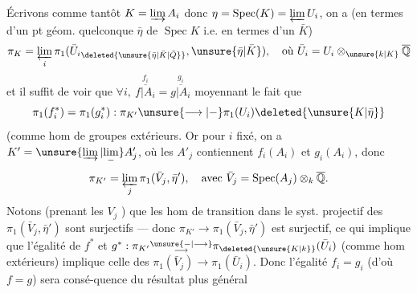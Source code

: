 Écrivons comme tantôt $K=\varinjlim A_i$ donc  $\eta=\operatorname{Spec}(K)=\varprojlim U_i$, on a (en termes d'un pt géom. quelconque $\bar\eta$ de $\operatorname{Spec}K$ i.e. en termes d'un $\bar K$)
\[
\pi_K=\varprojlim_i\pi_1(\bar U_i{}_{\deleted{\unsure{\bar\eta|\bar K|\bar Q}}},\unsure{\bar\eta|\bar K}),\quad\text{où }\bar U_i=U_i\otimes_{\unsure{k|K}}\overline{\mathbb Q}
\]
et il suffit de voir que $\forall i,\ \overset{f_i}{\overline{f|A_i}}=\overset{g_i}{\overline{g|A_i}}$  moyennant le fait que
\[
\pi_1(f_i^*)=\pi_1(g_i^*):\pi_{K'}\unsure{\longrightarrow|-}\pi_1(U_i)\deleted{\unsure{K|\bar\eta}}
\]
(comme hom de groupes extérieurs. Or pour $i$ fixé, on a $K'=\unsure{\varinjlim|\underset{-}{\lim}} A'_j$, où les $A'_j$ contiennent $f_i(A_i)$ et $g_i(A_i)$, donc
\[
\pi_{K'}=\varprojlim_j\pi_1(\bar V_j,\bar\eta'),\quad\text{avec }\bar V_j=\operatorname{Spec}(A_j)\otimes_k\overline{\mathbb Q}.
\]
Notons (prenant les $V_j$ ) que les hom de transition dans le syst. projectif des $\pi_1(\bar V_j,\bar\eta')$ sont surjectifs --- donc  $\pi_{K'}\longrightarrow\pi_1(\bar V_j,\bar\eta')$ est surjectif, ce qui implique que l'égalité de $f^*$ et $g^*:\pi_{K'}\substack{\unsure{-|\longrightarrow}\\\longrightarrow}\pi_{\deleted{\unsure{K|k}}}(\bar U_i)$ (comme hom extérieurs) implique celle des $\pi_1(\bar V_j)\longrightarrow\pi_1(\bar U_i)$.
Donc l'égalité $f_i=g_i$ (d'où $f=g$) sera consé-quence du résultat plus général\unsure{,|;}
